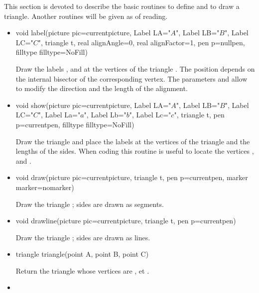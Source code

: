 \documentclass[pdftex]{article}
\begin{document}
This section is devoted to describe the basic routines to define and
to draw a triangle. Another routines will be given as of reading.
\begin{itemize}
\item {}
  \begin{Vcolor}
    void label(picture pic=currentpicture, Label LA="$A$",
    Label LB="$B$", Label LC="$C$",
    triangle t,
    real alignAngle=0,
    real alignFactor=1,
    pen p=nullpen, filltype filltype=NoFill)
  \end{Vcolor}
  Draw the labels ,  and  at the
  vertices of the triangle . The position depends on the
  internal bisector of the corresponding vertex. The
  parameters  and  allow to
  modify the direction and the length of the alignment.
\item {}
  \begin{Vcolor}
    void show(picture pic=currentpicture,
    Label LA="$A$", Label LB="$B$", Label LC="$C$",
    Label La="$a$", Label Lb="$b$", Label Lc="$c$",
    triangle t, pen p=currentpen, filltype filltype=NoFill)
  \end{Vcolor}
  Draw the triangle  and place the labels at the vertices of
  the triangle and the lengths of the sides. When coding this routine is useful to
  locate the vertices  ,  and .
\item {}
  \begin{Vcolor}
    void draw(picture pic=currentpicture, triangle t,
    pen p=currentpen, marker marker=nomarker)
  \end{Vcolor}
  Draw the triangle  ; sides are drawn as segments.
\item {}
  \begin{Vcolor}
    void drawline(picture pic=currentpicture, triangle t, pen p=currentpen)
  \end{Vcolor}
  Draw the triangle ; sides are drawn as lines.
\item {}
  \begin{Vcolor}
    triangle triangle(point A, point B, point C)
  \end{Vcolor}
  Return the triangle whose vertices are  ,  et .
\item {}

\end{itemize}
\end{document}
